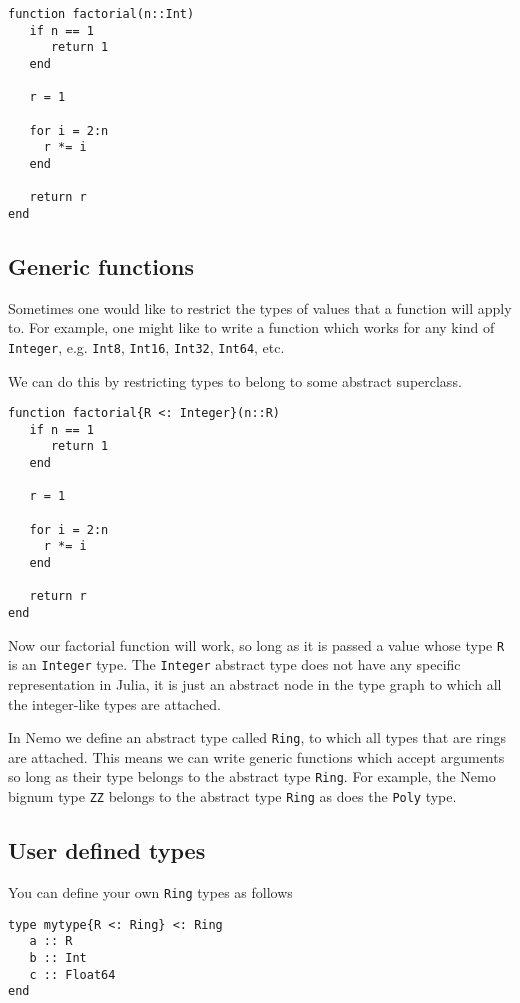 \documentclass[a4paper,10pt]{article}
\newcommand{\code}{\lstinline}
\begin{document}
{\begin{lstlisting}
function factorial(n::Int)
   if n == 1
      return 1
   end

   r = 1
   
   for i = 2:n
     r *= i
   end

   return r  
end
\end{lstlisting}

\subsection{Generic functions}

Sometimes one would like to restrict the types of values that a function will apply to. For
example, one might like to write a function which works for any kind of \code{Integer}, e.g.
\code{Int8}, \code{Int16}, \code{Int32}, \code{Int64}, etc.

We can do this by  restricting types to belong to some abstract superclass.

\begin{lstlisting}
function factorial{R <: Integer}(n::R)
   if n == 1
      return 1
   end

   r = 1
   
   for i = 2:n
     r *= i
   end

   return r  
end
\end{lstlisting}

Now our factorial function will work, so long as it is passed a value whose type \code{R} is
an \code{Integer} type. The \code{Integer} abstract type does not have any specific
representation in Julia, it is just an abstract node in the type graph to which all the
integer-like types are attached.

In Nemo we define an abstract type called \code{Ring}, to which all types that are rings
are attached. This means we can write generic functions which accept arguments so long as
their type belongs to the abstract type \code{Ring}. For example, the Nemo bignum type
\code{ZZ} belongs to the abstract type \code{Ring} as does the \code{Poly} type.

\subsection{User defined types}

You can define your own \code{Ring} types as follows

\begin{lstlisting}
type mytype{R <: Ring} <: Ring
   a :: R
   b :: Int
   c :: Float64
end
\end{lstlisting}

}
\end{document}
